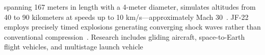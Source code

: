 spanning 167 meters in length with a 4-meter diameter, simulates altitudes from 40 to 90 kilometers at speeds up to 10 km/s---approximately Mach 30~\cite{jf22_unveiling, jf22_chinadaily}. JF-22 employs precisely timed explosions generating converging shock waves rather than conventional compression~\cite{jf22_newatlas}. Research includes gliding aircraft, space-to-Earth flight vehicles, and multistage launch vehicle












